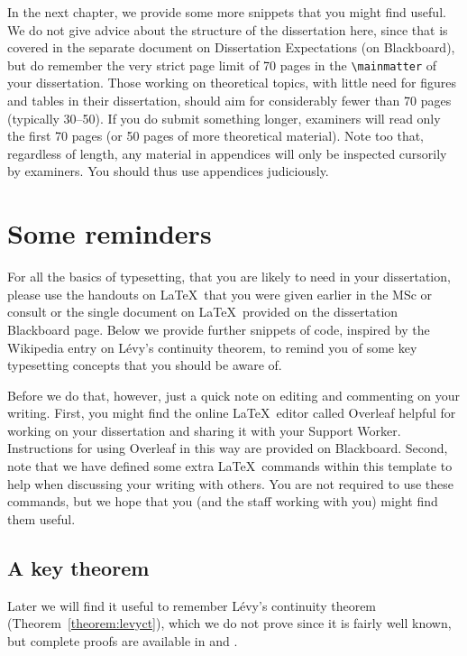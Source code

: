 \documentclass{somasmsc}
\begin{document}
In the next chapter, we provide some more snippets that you might find useful.  We do not give advice about the structure of the dissertation here, since that is covered in the separate document on Dissertation Expectations (on Blackboard), but do remember the very strict page limit of 70 pages in the \verb+\mainmatter+ of your dissertation. Those working on theoretical topics, with little need for figures and tables in their dissertation, should aim for considerably fewer than 70 pages (typically 30--50).  If you do submit something longer, examiners will read only the first 70 pages (or 50  pages of more theoretical material).  Note too that, regardless of length, any material in appendices will only be inspected cursorily by examiners. You should thus use appendices judiciously.


\chapter{Some reminders}\label{reminders}

For all the basics of typesetting, that you are likely to need in your dissertation, please use the handouts on \LaTeX\ that you were given earlier in the MSc or consult or the single document on \LaTeX\ provided on the dissertation Blackboard page.  Below we provide further snippets of code, inspired by the Wikipedia entry on L\'{e}vy's continuity theorem, to remind you of some key typesetting concepts that you should be aware of.

Before we do that, however, just a quick note on editing and commenting on your writing. First, you might find the online \LaTeX\ editor called Overleaf helpful for working on your dissertation and sharing it with your Support Worker. Instructions for using Overleaf in this way are provided on Blackboard. Second, note that we have defined some extra \LaTeX\ commands within this template to help when discussing your writing with others. You are not required to use these commands, but we hope that you (and the staff working with you) might find them useful.

\section{A key theorem}\label{theorem}

Later we will find it useful to remember L\'{e}vy's continuity theorem (Theorem~\ref{theorem:levyct}), which we do not prove since it is fairly well known, but complete proofs are available in \citet[section 18.1]{Williams} and \citet[Theorems 14.15 and 18.21]{Fristedt}.
\end{document}
